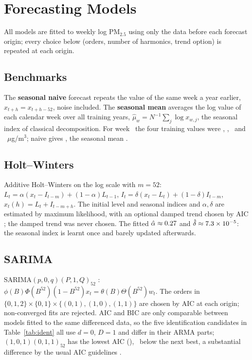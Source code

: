 \documentclass[11pt,a4paper,twoside,twocolumn]{extarticle}
\newcommand{\pmtwo}{PM$_{2.5}$}
\newcommand{\ugm}{$\mu$g/m$^3$}
\begin{document}
\section{Forecasting Models}
All models are fitted to weekly log \pmtwo{} using only the data before each forecast origin; every choice below (orders, number of harmonics, trend option) is repeated at each origin.
\subsection{Benchmarks}
The \textbf{seasonal naive} forecast repeats the value of the same week a year earlier, $\hat x_{t+h}=x_{t+h-52}$, noise included. The \textbf{seasonal mean} averages the log value of each calendar week over all training years, $\hat\mu_w=N^{-1}\sum_j\log x_{w,j}$, the seasonal index of classical decomposition. For week \exWeek\ the four training values were \exYa, \exYb, \exYc\ and \exYd~\ugm{}; naive gives \exNaive, the seasonal mean \exMean.
\subsection{Holt--Winters}
Additive Holt--Winters \cite{holt,winters} on the log scale with $m=52$: $L_t=\alpha(x_t-I_{t-m})+(1-\alpha)L_{t-1}$, $I_t=\delta(x_t-L_t)+(1-\delta)I_{t-m}$, $\hat x_t(h)=L_t+I_{t-m+h}$. The initial level and seasonal indices and $\alpha,\delta$ are estimated by maximum likelihood, with an optional damped trend chosen by AIC \cite{akaike}; the damped trend was never chosen. The fitted $\hat\alpha\approx0.27$ and $\hat\delta\approx7.3\times10^{-5}$: the seasonal index is learnt once and barely updated afterwards.
\subsection{SARIMA}
$\mathrm{SARIMA}(p,0,q)(P,1,Q)_{52}$ \cite{box}: $\phi(B)\Phi(B^{52})(1-B^{52})x_t=\theta(B)\Theta(B^{52})w_t$. The orders in $\{0,1,2\}\times\{0,1\}\times\{(0,1),(1,0),(1,1)\}$ are chosen by AIC at each origin; non-converged fits are rejected. AIC and BIC \cite{akaike,schwarz} are only comparable between models fitted to the same differenced data, so the five identification candidates in Table~\ref{tab:ident} all use $d=0$, $D=1$ and differ in their ARMA parts; $(1,0,1)(0,1,1)_{52}$ has the lowest AIC (\aicBest), \aicGap\ below the next best, a substantial difference by the usual AIC guidelines \cite{akaike}.
\begin{table}[t]\centering\small{}\caption{SARIMA candidates, log \pmtwo{}, 2015--18.}\label{tab:ident}\end{table}
\end{document}
